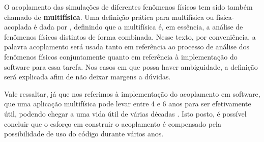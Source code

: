 O acoplamento das simulações de diferentes fenômenos físicos tem sido também chamado de \textbf{multifísica}. 
Uma definição prática para multifísica ou física-acoplada é dada por \cite{Lethbridge2005}, definindo que 
a multifísica é, em essência, a análise de fenômenos físicos distintos de forma combinada. Nesse texto, 
por conveniência, a palavra acoplamento será usada tanto em referência ao processo de análise dos fenômenos físicos conjuntamente 
quanto em referência à implementação do software para essa tarefa. Nos casos em que possa haver ambiguidade, 
a definição será explicada afim de não deixar margens a dúvidas.

Vale ressaltar, já que nos referimos à implementação do acoplamento em software, que uma aplicação multifísica 
pode levar entre 4 e 6 anos para ser efetivamente útil, podendo chegar a uma vida útil de várias décadas 
\cite{Graham2004}. Isto posto, é possível concluir que o esforço em construir o acoplamento é compensado 
pela possibilidade de uso do código durante vários anos.

